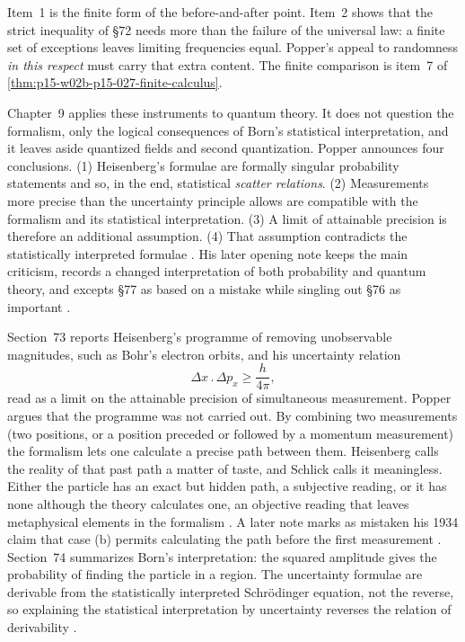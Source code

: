 Item~1 is the finite form of the before-and-after point. Item~2 shows
that the strict inequality of \S72 needs more than the failure of the
universal law: a finite set of exceptions leaves limiting frequencies
equal. Popper's appeal to randomness \emph{in this respect} must carry
that extra content. The finite comparison is item~7 of
\cref{thm:p15-w02b-p15-027-finite-calculus}.

Chapter~9 applies these instruments to quantum theory. It does not
question the formalism, only the logical consequences of Born's
statistical interpretation, and it leaves aside quantized fields and second
quantization. Popper announces four conclusions. (1) Heisenberg's
formulae are formally singular probability statements and so, in the
end, statistical \emph{scatter relations}. (2) Measurements more precise
than the uncertainty principle allows are compatible with the formalism
and its statistical interpretation. (3) A limit of attainable precision
is therefore an additional assumption. (4) That assumption contradicts
the statistically interpreted formulae
\parencite[chapter~9, opening]{Popper2002LogicDiscoveryUI}.
His later opening note keeps the main criticism, records a changed
interpretation of both probability and quantum theory, and excepts
\S77 as based on a mistake while singling out \S76 as important
\parencite[chapter~9, note~*1]{Popper2002LogicDiscoveryUI}.

Section~73 reports Heisenberg's programme of removing unobservable
magnitudes, such as Bohr's electron orbits, and his uncertainty
relation
\[
 \Delta x\,.\,\Delta p_x\geq\frac{h}{4\pi},
\]
read as a limit on the attainable precision of simultaneous
measurement. Popper argues that the programme was not carried out. By
combining two measurements (two positions, or a position preceded or
followed by a momentum measurement) the formalism lets one calculate a
precise path between them. Heisenberg calls the reality of that past
path a matter of taste, and Schlick calls it meaningless. Either the
particle has an exact but hidden path, a subjective reading, or it has
none although the theory calculates one, an objective reading that
leaves metaphysical elements in the formalism
\parencite[\S73]{Popper2002LogicDiscoveryUI}. A later note marks as
mistaken his 1934 claim that case (b) permits calculating the path
before the first measurement \parencite[\S73, note~4]{Popper2002LogicDiscoveryUI}.
Section~74 summarizes Born's interpretation: the squared amplitude gives
the probability of finding the particle in a region. The uncertainty
formulae are derivable from the statistically interpreted Schrödinger equation,
not the reverse, so explaining the statistical interpretation by
uncertainty reverses the relation of derivability
\parencite[\S74]{Popper2002LogicDiscoveryUI}.

